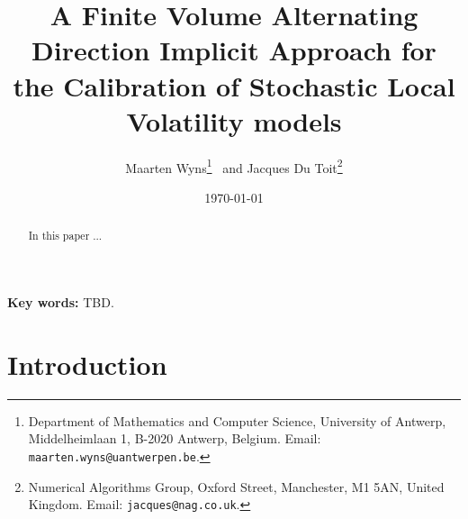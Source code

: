 \documentclass[10pt]{article}
\title{A Finite Volume Alternating Direction Implicit Approach for the Calibration of Stochastic Local Volatility models}
\author{Maarten Wyns\footnote{Department of Mathematics and Computer Science,
University of Antwerp, Middelheimlaan 1, B-2020 Antwerp, Belgium.
\mbox{Email}: \texttt{maarten.wyns@uantwerpen.be}.}
~and Jacques Du Toit\footnote{Numerical Algorithms Group, Oxford Street, Manchester, M1 5AN, United Kingdom. \mbox{Email}: \texttt{jacques@nag.co.uk}.}
}
\date{\today}
\begin{document}
\maketitle

\begin{abstract}
\noindent
In this paper ...
\end{abstract}
\vspace{0.2cm}\noindent
{\small\textbf{Key words:} TBD.}
\vspace{3mm}
\normalsize


\setcounter{equation}{0}
\section{Introduction}\label{intro}
\end{document}
